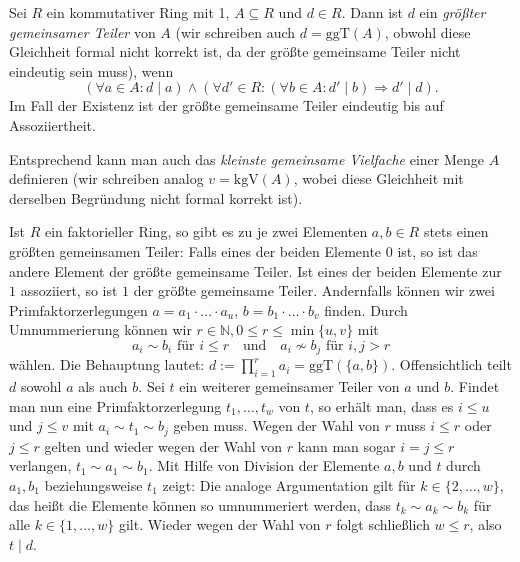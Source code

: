 \begin{definition}
    Sei $R$ ein kommutativer Ring mit 1, $A \subseteq R$ und $d \in R$. Dann ist $d$ ein \emph{größter gemeinsamer Teiler} von $A$ (wir schreiben auch $d = \mathrm{ggT}(A)$, obwohl diese Gleichheit formal nicht korrekt ist, da der größte gemeinsame Teiler nicht eindeutig sein muss), wenn
    $$ (\forall a \in A: d \mid a ) \land ( \forall d' \in R : ( \forall b \in A: d' \mid b ) \Rightarrow d' \mid d  ). $$
    Im Fall der Existenz ist der größte gemeinsame Teiler eindeutig bis auf Assoziiertheit.

    Entsprechend kann man auch das \emph{kleinste gemeinsame Vielfache} einer Menge $A$ definieren (wir schreiben  analog $v=\mathrm{kgV}(A)$, wobei diese Gleichheit mit derselben Begründung nicht formal korrekt ist).
\end{definition}

\begin{remark}
    Ist $R$ ein faktorieller Ring, so gibt es zu je zwei Elementen $a,b\in R$ stets einen größten gemeinsamen Teiler: Falls eines der beiden Elemente $0$ ist, so ist das andere Element der größte gemeinsame Teiler. Ist eines der beiden Elemente zur $1$ assoziiert, so ist $1$ der größte gemeinsame Teiler. Andernfalls können wir zwei Primfaktorzerlegungen $a=a_1\cdot\ldots\cdot a_u$, $b=b_1\cdot\ldots\cdot b_v$ finden. Durch Umnummerierung können wir $r\in\mathbb{N}, 0\le r\le \min\{u,v\}$ mit
    $$a_i\sim b_i \text{ für } i\le r\quad \text{und}\quad a_i\not\sim b_j \text{ für } i,j>r$$ wählen.
    Die Behauptung lautet: $d:=\prod_{i=1}^ra_i=\mathrm{ggT}(\{a,b\})$. Offensichtlich teilt $d$ sowohl $a$ als auch $b$. Sei $t$ ein weiterer gemeinsamer Teiler von $a$ und $b$. Findet man nun eine Primfaktorzerlegung $t_1,\ldots,t_w$ von $t$, so erhält man, dass es $i\le u$ und $j\le v$ mit $a_i\sim t_1\sim b_j$ geben muss. Wegen der Wahl von $r$ muss $i\le r$ oder $j\le r$ gelten und wieder wegen der Wahl von $r$ kann man sogar $i=j\le r$ verlangen, \obda $t_1\sim a_1\sim b_1$. Mit Hilfe von Division der Elemente $a,b$ und $t$ durch $a_1,b_1$ beziehungsweise $t_1$ zeigt: Die analoge Argumentation gilt für $k\in\{2,\ldots,w\}$, das heißt die Elemente können so umnummeriert werden, dass $t_k\sim a_k\sim b_k$ für alle $k\in \{1,\ldots,w\}$ gilt. Wieder wegen der Wahl von $r$ folgt schließlich $w\le r$, also $t\mid d$. 
\end{remark}


